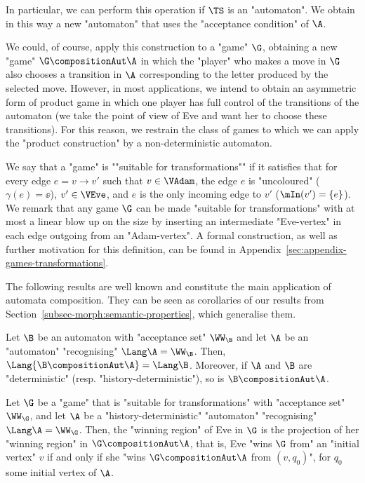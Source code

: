 \documentclass[10pt,a4paper]{amsart}
\renewcommand{\gg}{\gamma}
\newcommand{\re}[1]{\xrightarrow{#1}}
\begin{document}
In particular, we can perform this operation if $\TS$ is an "automaton". We obtain in this way a new "automaton" that uses the "acceptance condition" of $\A$. %


We could, of course, apply this construction to a "game" $\G$, obtaining a new "game" $\G\compositionAut \A$ in which the "player" who makes a move in $\G$ also chooses a transition in $\A$ corresponding to the letter produced by the selected move. However, in most applications, we intend to obtain an asymmetric form of product game in which one player has full control of the transitions of the automaton (we take the point of view of Eve and want her to choose these transitions). For this reason, we restrain the class of games to which we can apply the "product construction" by a non-deterministic automaton. 

\AP We say that a "game" is ""suitable for transformations"" if it satisfies that for every edge $e = v\re{}v'$ such that $v\in \VAdam$, the edge $e$ is "uncoloured" ($\gg(e)=\ee$), $v'\in \VEve$, and $e$ is the only incoming edge to $v'$ ($\mIn(v') = \{e\}$). 
We remark that any game $\G$ can be made "suitable for transformations" with at most a linear blow up on the size by inserting an intermediate "Eve-vertex" in each edge outgoing from an "Adam-vertex". A formal construction, as well as further motivation for this definition, can be found in Appendix~\ref{sec:appendix-games-transformations}. 




The following results are well known and constitute the main application of automata composition. They can be seen as corollaries of our results from Section~\ref{subsec-morph:semantic-properties}, which generalise them.

\begin{proposition}[Folklore]\label{prop-prelim:composition_automata}
	Let $\B$ be an automaton with "acceptance set" $\WW_{\B}$  and let $\A$ be an "automaton" "recognising" $\Lang \A=\WW_{\B}$. Then, $\Lang{ \B \compositionAut \A}=\Lang \B$.
	Moreover, if $\A$ and $\B$ are "deterministic" (resp. "history-deterministic"), so is $\B \compositionAut \A$.
\end{proposition}

\begin{proposition}[\cite{HP06}]\label{prop-prelim:composition_games_HD}
	Let $\G$ be a "game" that is "suitable for transformations" with "acceptance set" $\WW_\G$, and let $\A$ be a "history-deterministic" "automaton" "recognising" $\Lang \A=\WW_{\G}$. Then, the "winning region" of Eve in $\G$ is the projection of her "winning region" in $\G\compositionAut \A$, that is, Eve "wins $\G$ from" an "initial vertex" $v$ if and only if she "wins $\G\compositionAut \A$ from $(v, q_0)$", for $q_0$  some initial vertex of $\A$. 
\end{proposition}
\end{document}
